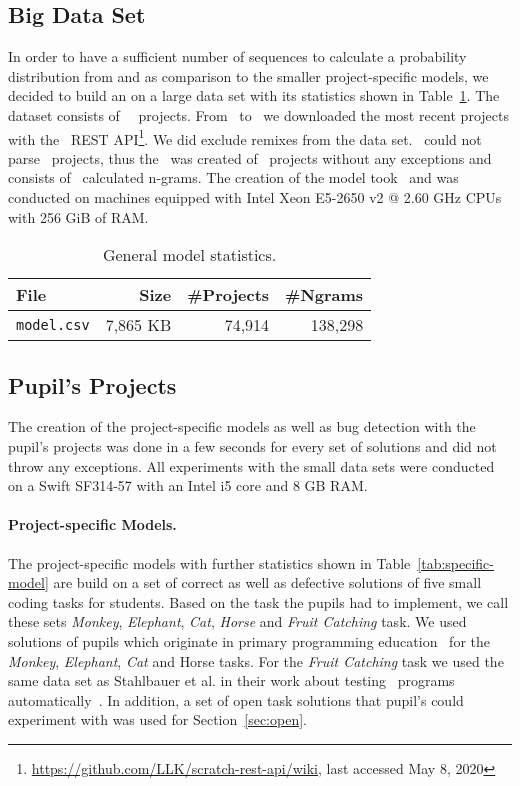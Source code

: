 \subsection{Big Data Set}\label{subsec:trainingset}
In order to have a sufficient number of sequences to calculate a probability distribution from and as comparison to the smaller project-specific models, we decided to build an \ngram{} on a large data set with its statistics shown in Table~\ref{tab:general-model}. The dataset consists of \numlarge\ \scratch\ projects. From \monthstart\ to \monthend\ we downloaded the most recent projects with the \scratch\ REST API\footnote{\url{https://github.com/LLK/scratch-rest-api/wiki}, last accessed May 8, 2020}. We did exclude remixes from the data set. \litterbox\ could not parse \parsingexcp\ projects, thus the \ngram\ was created of \successfullyanalysed\ projects without any exceptions and consists of \calculatedngrams\ calculated n-grams. The creation of the model took \creationtime\ and was conducted on machines equipped with Intel Xeon E5-2650 v2 @ 2.60 GHz CPUs with 256 GiB of RAM.

\begin{table}[hbtp]
    \centering
    \caption[General model statistics]{\label{tab:general-model}General model statistics.}
    \begin{tabular}{lrrr}
        \toprule
        File & Size & \#Projects & \#Ngrams\\
        \midrule
        \texttt{model.csv} & 7,865 KB & 74,914 & 138,298 \\
        \bottomrule
    \end{tabular}
\end{table}

\subsection{Pupil's Projects}\label{subsec:bugset}
The creation of the project-specific models as well as bug detection with the pupil's projects was done in a few seconds for every set of solutions and did not throw any exceptions. All experiments with the small data sets were conducted on a Swift SF314-57 with an Intel i5 core and 8 GB RAM.

\paragraph{Project-specific Models.}
The project-specific models with further statistics shown in Table~\ref{tab:specific-model} are build on a set of correct as well as defective solutions of five small coding tasks for students. Based on the task the pupils had to implement, we call these sets \textit{Monkey}, \textit{Elephant}, \textit{Cat}, \textit{Horse} and \textit{Fruit Catching} task. We used solutions of pupils which originate in primary programming education~\cite{katharina} for the \textit{Monkey}, \textit{Elephant}, \textit{Cat} and {Horse} tasks. For the \textit{Fruit Catching} task we used the same data set as Stahlbauer et al. in their work about testing \scratch\ programs automatically~\cite{whisker}. In addition, a set of open task solutions that pupil's could experiment with was used for Section~\ref{sec:open}. 

